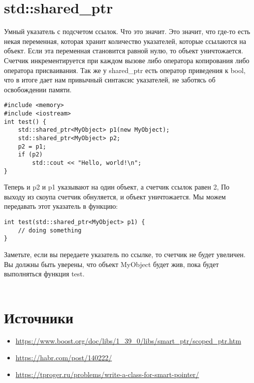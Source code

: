 \documentclass {article}
\begin{document}
\section{std::shared\_ptr }
Умный указатель с подсчетом ссылок. Что это значит. Это значит, что где-то есть некая переменная, которая хранит количество указателей, которые ссылаются на объект. Если эта переменная становится равной нулю, то объект уничтожается. Счетчик инкрементируется при каждом вызове либо оператора копирования либо оператора присваивания. Так же у shared\_ptr есть оператор приведения к bool, что в итоге дает нам привычный синтаксис указателей, не заботясь об освобождении памяти.
\begin{lstlisting}[caption=Пример]
#include <memory> 
#include <iostream>
int test() {
    std::shared_ptr<MyObject> p1(new MyObject);
    std::shared_ptr<MyObject> p2;    
    p2 = p1;    
    if (p2)
        std::cout << "Hello, world!\n";
}
\end{lstlisting}
Теперь и p2 и p1 указывают на один объект, а счетчик ссылок равен 2, По выходу из скоупа счетчик обнуляется, и объект уничтожается. Мы можем передавать этот указатель в функцию:
\begin{lstlisting}[caption=Пример]
int test(std::shared_ptr<MyObject> p1) {
    // doing something
}
\end{lstlisting}
Заметьте, если вы передаете указатель по ссылке, то счетчик не будет увеличен. Вы должны быть уверены, что объект MyObject будет жив, пока будет выполняться функция test.\\\\
\newline
\section{Источники}
\begin{itemize}
\item \url{https://www.boost.org/doc/libs/1_39_0/libs/smart_ptr/scoped_ptr.htm}
\item \url{https://habr.com/post/140222/}
\item \url{https://tproger.ru/problems/write-a-class-for-smart-pointer/}
\end{itemize}
\newpage
\tableofcontents
\end{document}
